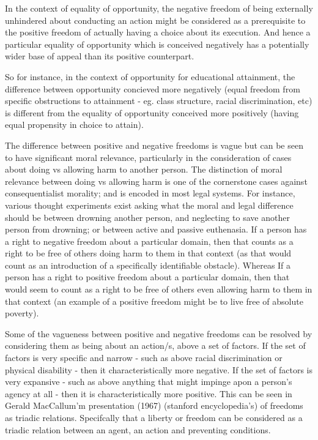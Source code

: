 In the context of equality of opportunity, the negative freedom of being externally unhindered about conducting an action might be considered as a prerequisite to the positive freedom of actually having a choice about its execution.
And hence a particular equality of opportunity which is conceived negatively has a  potentially wider base of appeal than its positive counterpart.

So for instance, in the context of opportunity for educational attainment, the difference between opportunity concieved more negatively (equal freedom from specific obstructions to attainment - eg. class structure, racial discrimination, etc) is different from the equality of opportunity conceived more positively (having equal propensity in choice to attain).

The difference between positive and negative freedoms is vague but can be seen to have significant moral relevance, particularly in the consideration of cases about doing vs allowing harm to another person.
The distinction of moral relevance between doing vs allowing harm is one of the cornerstone cases against consequentialist morality; and is encoded in most legal systems.
For instance, various thought experiments exist asking what the moral and legal difference should be between drowning another person, and neglecting to save another person from drowning; or between active and passive euthenasia.
If a person has a right to negative freedom about a particular domain, then that counts as a right to be free of others doing harm to them in that context (as that would count as an introduction of a specifically identifiable obstacle).
Whereas If a person has a right to positive freedom about a particular domain, then that would seem to count as a right to be free of others even allowing harm to them in that context (an example of a positive freedom might be to live free of absolute poverty).

Some of the vagueness between positive and negative freedoms can be resolved by considering them as being about an action/s, above a set of factors.
If the set of factors is very specific and narrow - such as above racial discrimination or physical disability - then it characteristically more negative.
If the set of factors is very expansive - such as above anything that might impinge apon a person's agency at all - then it is characteristically more positive.
This can be seen in Gerald MacCallum'm presentation (1967) (stanford encyclopedia's) of freedoms as triadic relations. Specifcally that a liberty or freedom can be considered as a triadic relation between an agent, an action and preventing conditions.

